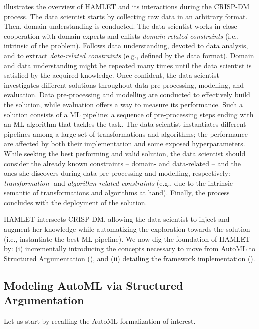  illustrates the overview of HAMLET and its interactions during the CRISP-DM process.
The data scientist starts by collecting raw data in an arbitrary format.
Then, domain understanding is conducted.
The data scientist works in close cooperation with domain experts and enlists \emph{domain-related constraints} (i.e., intrinsic of the problem).
Follows data understanding, devoted to data analysis, and to extract \emph{data-related constraints} (e.g., defined by the data format).
Domain and data understanding might be repeated many times until the data scientist is satisfied by the acquired knowledge.
Once confident, the data scientist investigates different solutions throughout data pre-processing, modelling, and evaluation.
Data pre-processing and modelling are conducted to effectively build the solution, while evaluation offers a way to measure its performance.
Such a solution consists of a ML pipeline: a sequence of pre-processing steps ending with an ML algorithm that tackles the task.
The data scientist instantiates different pipelines among a large set of transformations and algorithms; the performance are affected by both their implementation and some exposed hyperparameters.
While seeking the best performing and valid solution, the data scientist should consider the already known constraints -- domain- and data-related -- and the ones she discovers during data pre-processing and modelling, respectively: \emph{transformation-} and \emph{algorithm-related constraints} (e.g., due to the intrinsic semantic of transformations and algorithms at hand).
Finally, the process concludes with the deployment of the solution.

HAMLET intersects CRISP-DM, allowing the data scientist to inject and augment her knowledge while automatizing the exploration towards the solution (i.e., instantiate the best ML pipeline).
We now dig the foundation of HAMLET by: (i) incrementally introducing the concepts necessary to move from AutoML to Structured Argumentation (), and (ii) detailing the framework implementation  ().

\subsection{Modeling AutoML via Structured Argumentation}
\label{hamlet-ssec:argumentation-formalization}

Let us start by recalling the AutoML formalization of interest.

